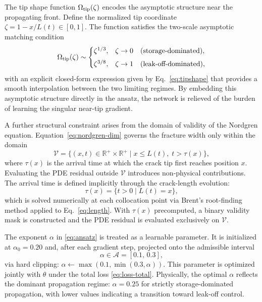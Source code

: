 \documentclass[a4paper,fleqn]{cas-sc}
\begin{document}
The tip shape function $\Omega_{\rm tip}(\zeta)$ encodes the
asymptotic structure near the propagating front. Define the
normalized tip coordinate $\zeta = 1 - x/L(t) \in [0,1]$. The
function satisfies the two-scale asymptotic matching condition
\begin{equation}
  \Omega_{\rm tip}(\zeta) \sim
  \begin{cases}
    \zeta^{1/3}, & \zeta \to 0 \quad (\text{storage-dominated}), \\[4pt]
    \zeta^{3/8}, & \zeta \to 1 \quad (\text{leak-off-dominated}),
  \end{cases}
  \label{eq:tip-asymptotics}
\end{equation}
with an explicit closed-form expression given by
Eq.~\eqref{eq:tipshape} that provides a smooth interpolation between
the two limiting regimes. By embedding this asymptotic structure
directly in the ansatz, the network is relieved of the burden of
learning the singular near-tip gradient.

A further structural constraint arises from the domain of validity
of the Nordgren equation. Equation~\eqref{eq:nordgren-dim} governs
the fracture width only within the domain
\begin{equation}
  \mathcal{V} = \{(x,t) \in \mathbb{R}^{+} \times \mathbb{R}^{+}
  \mid x \leq L(t),\; t > \tau(x)\},
  \label{eq:valid-domain}
\end{equation}
where $\tau(x)$ is the arrival time at which the crack tip first
reaches position $x$. Evaluating the PDE residual outside
$\mathcal{V}$ introduces non-physical contributions. The arrival
time is defined implicitly through the crack-length evolution:
\begin{equation}
  \tau(x) = \{t > 0 \mid L(t) = x\},
  \label{eq:tau-inversion}
\end{equation}
which is solved numerically at each collocation point via Brent's
root-finding method applied to Eq.~\eqref{eq:length}. With
$\tau(x)$ precomputed, a binary validity mask is constructed and
the PDE residual is evaluated exclusively on $\mathcal{V}$.

The exponent $\alpha$ in \eqref{eq:ansatz} is treated as a learnable
parameter. It is initialized at $\alpha_0 = 0.20$ and, after each
gradient step, projected onto the admissible interval
\begin{equation}
  \alpha \in \mathcal{A} = [0.1,\, 0.3],
  \label{eq:alpha-bounds}
\end{equation}
via hard clipping: $\alpha \gets \max(0.1, \min(0.3, \alpha))$. This
parameter is optimized jointly with $\theta$ under the total loss
\eqref{eq:loss-total}. Physically, the optimal $\alpha$ reflects the
dominant propagation regime: $\alpha = 0.25$ for strictly
storage-dominated propagation, with lower values indicating a
transition toward leak-off control.
\end{document}
